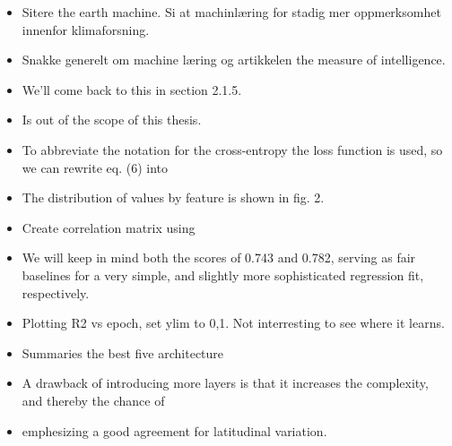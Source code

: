 \begin{itemize}
    \item Sitere the earth machine. Si at machinlæring for stadig mer oppmerksomhet innenfor klimaforsning. 
    \item Snakke generelt om machine læring og artikkelen the measure of intelligence. 
    \item We’ll come back to this in section 2.1.5.
    \item Is out of the scope of this thesis.
    \item To abbreviate the notation for the cross-entropy the loss function is used, so we can rewrite eq. (6) into
    \item The distribution of values
    by feature is shown in fig. 2.
    \item Create correlation matrix using 
    \item We will keep in mind both the scores of 0.743 and 0.782, serving
    as fair baselines for a very simple, and slightly more sophisticated
    regression fit, respectively.
    \item Plotting R2 vs epoch, set ylim to 0,1. Not interresting to see where it learns.
    \item Summaries the best five architecture 
    \item A drawback of introducing more layers
    is that it increases the complexity, and thereby the chance of
    \item emphesizing a good agreement for latitudinal variation.
 \end{itemize}


